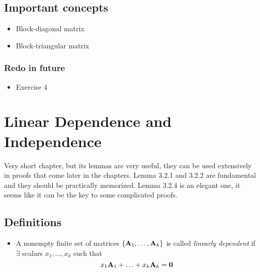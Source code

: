 \documentclass[a4paper, oneside]{book}
\begin{document}
\section*{Important concepts}
\begin{itemize}
\item Block-diagonal matrix
\item Block-triangular matrix
\end{itemize}

\subsection{Redo in future}
\begin{itemize}
\item Exercise 4
\end{itemize}















\chapter{Linear Dependence and Independence}
Very short chapter, but its lemmas are very useful, they can be used extensively in proofs that come later in the chapters. Lemma 3.2.1 and 3.2.2 are fundamental and they should be practically memorized. Lemma 3.2.4 is an elegant one, it seems like it can be the key to some complicated proofs. 

\section{Definitions}
\begin{itemize}
\item A nonempty finite set of matrices $\{\mathbf A_1, \hdots,  \mathbf A_k\}$ is called \textit{linearly dependent} if $\exists$ scalars $x_1,\hdots, x_k$ such that $$x_1 \mathbf A_1 + \hdots + x_k \mathbf A_k = \mathbf 0$$
\end{itemize}
\end{document}
